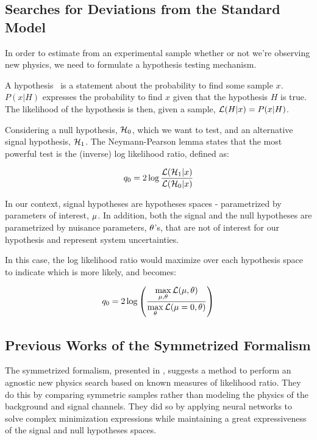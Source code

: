 \documentclass[thesis/Elad_Kliger_Thesis.tex]{subfiles}
\begin{document}
\subsection{Searches for Deviations from the Standard Model}

In order to estimate from an experimental sample whether or not we're observing new physics, we need to formulate a hypothesis testing mechanism.

A hypothesis~\cite{Cowan_2013_Statistics_LHC} is a statement about the probability to find some sample $x$. $P(x|H)$ expresses the probability to find $x$ given that the hypothesis $H$ is true. The likelihood of the hypothesis is then, given a sample, $\mathcal{L}(H|x) = P(x|H)$.

Considering a null hypothesis, ${{\mathcal{H}_{0}}}$, which we want to test, and an alternative signal hypothesis, ${\mathcal{H}_{1}}$. The Neymann-Pearson lemma states that the most powerful test is the (inverse) log likelihood ratio, defined as:

\begin{equation}
    {q_{0}} = 2 \log \dfrac{\mathcal{L}({\mathcal{H}_{1}}|x)}{\mathcal{L}({{\mathcal{H}_{0}}}|x)}
\end{equation}

In our context, signal hypotheses are hypotheses spaces - parametrized by parameters of interest, ${\mu}$. In addition, both the signal and the null hypotheses are parametrized by nuisance parameters, ${\theta}$'s, that are not of interest for our hypothesis and represent system uncertainties.

In this case, the log likelihood ratio would maximize over each hypothesis space to indicate which is more likely, and becomes:

\begin{equation}
    {q_{0}} = 2 \log \left( \dfrac{\max\limits_{{\mu}, {\theta}} \mathcal{L}({{\mu}},{{\theta}})}{\max\limits_{{\theta}} \mathcal{L}({\mu} = 0, {{\theta}})} \right)
\end{equation}

\subsection{Previous Works of the Symmetrized Formalism}

The symmetrized formalism, presented in \cite{Italian_no_1_Learning_New_Physics_from_a_Machine, Italian_no_2_Learning_New_Physics_from_an_Imperfect_Machine}, suggests a method to perform an agnostic new physics search based on known measures of likelihood ratio. They do this by comparing symmetric samples rather than modeling the physics of the background and signal channels. They did so by applying neural networks to solve complex minimization expressions while maintaining a great expressiveness of the signal and null hypotheses spaces.
\end{document}
